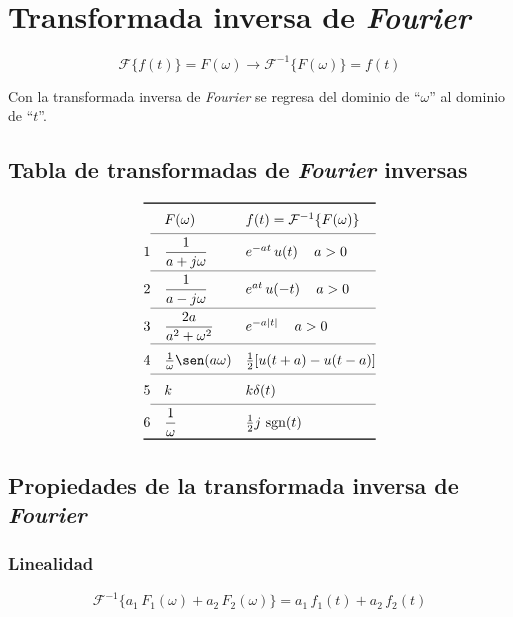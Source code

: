 \chapter{Transformada inversa de \emph{Fourier}}

\begin{equation}
    \mathcal{F}\{f(t)\}=F(\omega)
    \rightarrow
    \mathcal{F}^{-1}\{F(\omega)\}=f(t)
\end{equation}

Con la transformada inversa de \emph{Fourier} se regresa del dominio de
``$\omega$'' al dominio de ``$t$''.

\section{Tabla de transformadas de \emph{Fourier} inversas}

\begin{equation*}
\def\arraystretch{1.4}
\begin{array}{@{}cll@{}}
\toprule
 & F(\omega) & f(t)=\mathcal{F}^{-1}\{F(\omega)\}\\
\cmidrule(l){1-3}
 1 & \dfrac{1}{a+j\omega}
   & e^{-at}\,u(t)\quad\,a>0\\
\cmidrule(l){1-3}
 2 & \dfrac{1}{a-j\omega}
   & e^{at}\,u(-t)\quad\,a>0\\
\cmidrule(l){1-3}
 3 & \dfrac{2a}{a^2+\omega^2}
   & e^{-a|t|}\quad\,a>0\\
\cmidrule(l){1-3}
 4 & \frac{1}{\omega}\sen(a\omega)
   & \frac{1}{2}[u(t+a)-u(t-a)]\\
\cmidrule(l){1-3}
 5 & k
   & k\delta(t)\\
\cmidrule(l){1-3}
 6 & \dfrac{1}{\omega}
   & \frac{1}{2}j\,\sgn(t)\\
\bottomrule
\end{array}
\end{equation*}

\section{Propiedades de la transformada inversa de \emph{Fourier}}

\subsection{Linealidad}
\begin{equation}
    \mathcal{F}^{-1}\{a_1\,F_1(\omega)+a_2\,F_2(\omega)\}
    =a_1\,f_1(t)+a_2\,f_2(t)
\end{equation}

